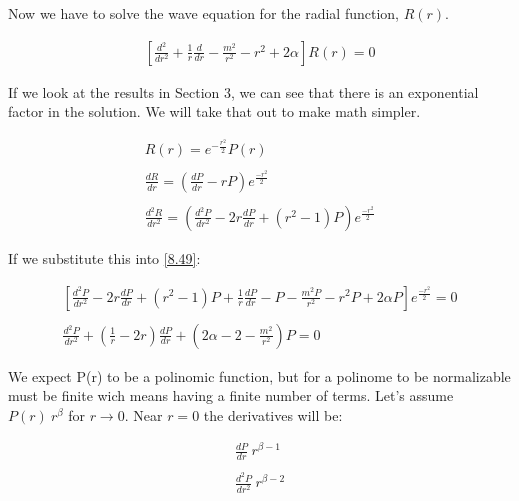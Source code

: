 Now we have to solve the wave equation for the radial function, $R(r)$.

\begin{equation}
  \label{8.49}
  \begin{array}{c}
    \left[\frac{d^2}{dr^2}+\frac{1}{r}\frac{d}{dr}-\frac{m^2}{r^2}-r^2+2\alpha\right]R(r) = 0
  \end{array}
\end{equation}

If we look at the results in Section 3, we can see that there is an exponential factor in the solution. We will take that out to make math simpler.

\begin{equation}
  \begin{array}{c}
    R(r) = e^{-\frac{r^2}{2}} P(r)
    \\

    \\
    \frac{dR}{dr} = \left(\frac{dP}{dr}-rP \right)e^{\frac{-r^2}{2}}
    \\

    \\
    \frac{d^2R}{dr^2} = \left(\frac{d^2P}{dr^2}-2r\frac{dP}{dr}+(r^2-1)P \right)e^{\frac{-r^2}{2}}
  \end{array}
\end{equation}

If we substitute this into \ref{8.49}:

\begin{equation}
  \begin{array}{c}
    \left[\frac{d^2P}{dr^2}- 2r\frac{dP}{dr} + (r^2-1)P +\frac{1}{r}\frac{dP}{dr}-P-\frac{m^2P}{r^2}-r^2P+2\alpha P\right]e^{\frac{-r^2}{2}} = 0
    \\

    \\
    \frac{d^2P}{dr^2} + \left(\frac{1}{r}-2r\right)\frac{dP}{dr}+\left(2\alpha-2-\frac{m^2}{r^2}\right)P = 0
  \end{array}
\end{equation}



We expect P(r) to be a polinomic function, but for a polinome to be normalizable must be finite wich means having a finite number of terms. Let's assume $P(r) ~ r^\beta$ for $r\to 0$. Near $r=0$ the derivatives will be:

\begin{equation}
  \begin{array}{c}
    \frac{dP}{dr} ~ r^{\beta-1}
    \\

    \\
    \frac{d^2P}{dr^2} ~ r^{\beta-2}
  \end{array}
\end{equation}


